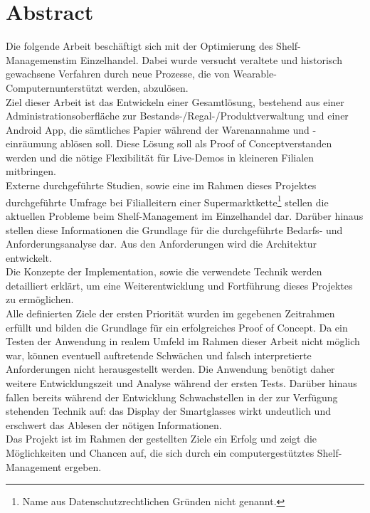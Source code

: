 \chapter*{Abstract} %

Die folgende Arbeit beschäftigt sich mit der Optimierung des \glqq Shelf-Managemenst\grqq im Einzelhandel. Dabei wurde versucht veraltete und historisch gewachsene Verfahren durch neue Prozesse, die von \glqq Wearable-Computern\grqq unterstützt werden, abzulösen.\\

Ziel dieser Arbeit ist das Entwickeln einer Gesamtlösung, bestehend aus einer Administrationsoberfläche zur Bestands-/Regal-/Produktverwaltung und einer Android App, die sämtliches Papier während der Warenannahme und -einräumung ablösen soll. Diese Lösung soll als \glqq Proof of Concept\grqq verstanden werden und die nötige Flexibilität für Live-Demos in kleineren Filialen mitbringen.\\

Externe durchgeführte Studien, sowie eine im Rahmen dieses Projektes durchgeführte Umfrage bei Filialleitern einer Supermarktkette\footnote{Name aus Datenschutzrechtlichen Gründen nicht genannt.} stellen die aktuellen Probleme beim Shelf-Management im Einzelhandel dar. Darüber hinaus stellen diese Informationen die Grundlage für die durchgeführte Bedarfs- und Anforderungsanalyse dar. Aus den Anforderungen wird die Architektur entwickelt.\\

Die Konzepte der Implementation, sowie die verwendete Technik werden detailliert erklärt, um eine Weiterentwicklung und Fortführung dieses Projektes zu ermöglichen.\\

Alle definierten Ziele der ersten Priorität wurden im gegebenen Zeitrahmen erfüllt und bilden die Grundlage für ein erfolgreiches \glqq Proof of Concept\grqq . Da ein Testen der Anwendung in realem Umfeld im Rahmen dieser Arbeit nicht möglich war, können eventuell auftretende Schwächen und falsch interpretierte Anforderungen nicht herausgestellt werden. Die Anwendung benötigt daher weitere Entwicklungszeit und Analyse während der ersten Tests. Darüber hinaus fallen bereits während der Entwicklung Schwachstellen in der zur Verfügung stehenden Technik auf: das Display der Smartglasses wirkt undeutlich und erschwert das Ablesen der nötigen Informationen.\\

Das Projekt ist im Rahmen der gestellten Ziele ein Erfolg und zeigt die Möglichkeiten und Chancen auf, die sich durch ein computergestütztes Shelf-Management ergeben.